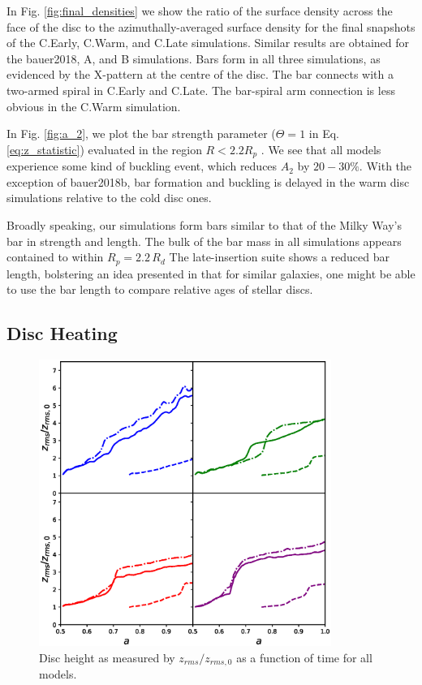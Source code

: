 In Fig. \ref{fig:final_densities} we show the ratio of the surface
density across the face of the disc to the azimuthally-averaged
surface density for the final snapshots of the C.Early, C.Warm,
and C.Late simulations. Similar results are obtained for the
bauer2018, A, and B simulations. Bars form in all three simulations,
as evidenced by the X-pattern at the centre of the disc. The bar
connects with a two-armed spiral in C.Early and C.Late. The 
bar-spiral arm connection is less obvious in the C.Warm simulation.

In Fig. \ref{fig:a_2}, we plot the bar strength parameter {($\Theta=1$ in Eq. \eqref{eq:z_statistic})} evaluated in
the region $R < 2.2 R_p$ \citep{debattista_sellwood_2000}. We see that
all models experience some kind of buckling event, which reduces $A_2$
by $20-30\%$.  With the exception of bauer2018b, bar formation and
buckling is delayed in the warm disc simulations relative to the cold
disc ones.

Broadly speaking, our simulations form bars similar to that of the
Milky Way's bar in strength and length. The bulk of the bar mass in
all simulations appears contained to within $R_p = 2.2\, R_d$ The
late-insertion suite shows a reduced bar length, bolstering an idea
presented in \citet{bauer2018b} that for similar galaxies, one might
be able to use the bar length to compare relative ages of stellar
discs.

\subsection{Disc Heating}
\begin{figure}
	\centering
	\includegraphics[width=0.85\textwidth]{../figures/z_rms_all_models_four_panel.eps}
	\caption{Disc height as measured by $z_{rms}/z_{rms,0}$ as a function of time for all models.} \label{fig:z_rms}
\end{figure}

